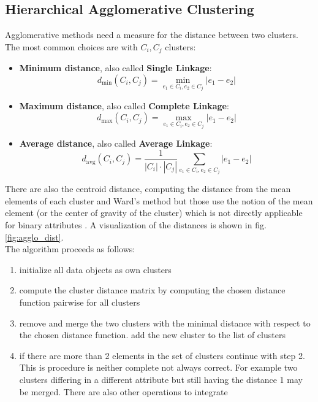 \subsection{Hierarchical Agglomerative Clustering}\label{\positionnumber}
Agglomerative methods need a measure for the distance between two clusters. The most common choices are with $C_i, C_j$ clusters:
\begin{itemize}
    \item \textbf{Minimum distance}, also called \textbf{Single Linkage}: 
    \[d_{\text{min}}(C_i, C_j) = \min_{e_1 \in C_i, e_2 \in C_j} |e_1 - e_2|\]
    \item \textbf{Maximum distance}, also called \textbf{Complete Linkage}: 
    \[d_{\text{max}}(C_i, C_j) = \max_{e_1 \in C_i, e_2 \in C_j} |e_1 - e_2|\]
    \item \textbf{Average distance}, also called \textbf{Average Linkage}: 
    \[d_{\text{avg}}(C_i, C_j) = \frac{1}{|C_i| \cdot |C_j|} \sum_{e_1 \in C_i, e_2 \in C_j} |e_1 - e_2|\]
\end{itemize}
There are also the centroid distance, computing the distance from the mean elements of each cluster and Ward's method but those use the notion of the mean element (or the center of gravity of the cluster) which is not directly applicable for binary attributes \cite{mirkin2013mathematical, han2011data}. A visualization of the distances is shown in fig. \ref{fig:agglo_dist}.
 \\
The algorithm proceeds as follows: 
\begin{enumerate}
    \item initialize all data objects as own clusters
    \item compute the cluster distance matrix by computing the chosen distance function pairwise for all clusters
    \item remove and merge the two clusters with the minimal distance with respect to the chosen distance function. add the new cluster to the list of clusters
    \item if there are more than 2 elements in the set of clusters continue with step 2. This is procedure is neither complete not always correct. For example two clusters differing in a different attribute but still having the distance 1 may be merged. There are also other operations to integrate 
\end{enumerate}
